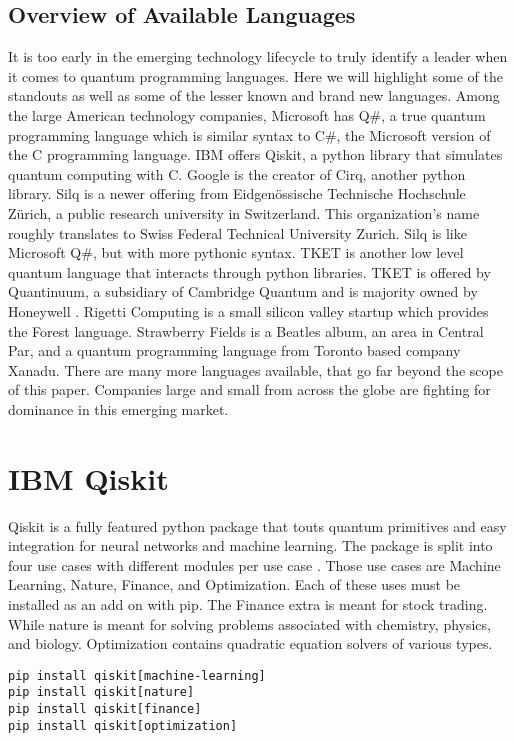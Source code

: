 \documentclass[conference]{IEEEtran}
\begin{document}
\subsection{Overview of Available Languages}
It is too early in the emerging technology lifecycle to truly identify a leader when it comes to quantum programming languages. 
Here we will highlight some of the standouts as well as some of the lesser known and brand new languages. 
Among the large American technology companies, Microsoft has Q\#, a true quantum programming language which is similar syntax to C\#, the Microsoft version of the C programming language. 
IBM offers Qiskit, a python library that simulates quantum computing with C. 
Google is the creator of Cirq, another python library. 
Silq is a newer offering from Eidgenössische Technische Hochschule Zürich, a public research university in Switzerland. 
This organization's name roughly translates to Swiss Federal Technical University Zurich. 
Silq is like Microsoft Q\#, but with more pythonic syntax. 
TKET is another low level quantum language that interacts through python libraries. 
TKET is offered by Quantinuum, a subsidiary of Cambridge Quantum and is majority owned by Honeywell \cite{b4}. 
Rigetti Computing is a small silicon valley startup which provides the Forest language. 
Strawberry Fields is a Beatles album, an area in Central Par, and a quantum programming language from Toronto based company Xanadu. 
There are many more languages available, that go far beyond the scope of this paper. 
Companies large and small from across the globe are fighting for dominance in this emerging market.

\section{IBM Qiskit}
Qiskit is a fully featured python package that touts quantum primitives and easy integration for neural networks and machine learning. 
The package is split into four use cases with different modules per use case \cite{b7}. 
Those use cases are Machine Learning, Nature, Finance, and Optimization. 
Each of these uses must be installed as an add on with pip. 
The Finance extra is meant for stock trading. 
While nature is meant for solving problems associated with chemistry, physics, and biology. 
Optimization contains quadratic equation solvers of various types. 

\begin{verbatim}
pip install qiskit[machine-learning]
pip install qiskit[nature]
pip install qiskit[finance]
pip install qiskit[optimization]
\end{verbatim}
\end{document}
